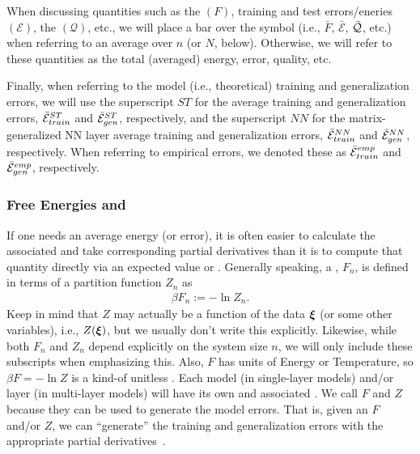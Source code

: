 {When discussing quantities such as the \FreeEnergy $(F)$, 
training and test errors/eneries $(\mathcal{E})$, 
the \LayerQuality $(\mathcal{Q})$, etc.,
we will place a bar over the symbol (i.e., $\bar{F}$, $\bar{\mathcal{E}}$, $\bar{\mathcal{Q}}$, etc.) when referring to
an average over $n$ (or $N$, below). 
Otherwise, we will refer to these quantities as the total (averaged) energy, error, quality, etc.


Finally, when referring to the model (i.e., theoretical)
training and generalization errors, we will use the superscript $ST$ for
the average \StudentTeacher training and generalization errors, $\bar{\mathcal{E}}^{ST}_{train}$ and $\bar{\mathcal{E}}^{ST}_{gen}$, respectively, and
the superscript $NN$ for the matrix-generalized NN layer average
training and generalization errors, $\bar{\mathcal{E}}^{NN}_{train}$ and $\bar{\mathcal{E}}^{NN}_{gen}$, respectively.
When referring to empirical errors, we denoted these as $\bar{\mathcal{E}}^{emp}_{train}$ and $\bar{\mathcal{E}}^{emp}_{gen}$, respectively.


\subsubsection{Free Energies and \GeneratingFunctions} 
\label{sxn:mathP_free_energies}


If one needs an average energy (or error), 
it is often easier to calculate the associated \FreeEnergy and take corresponding partial derivatives
than it is to compute that quantity directly via an expected value or \ThermalAverage.
Generally speaking, a \FreeEnergy, $F_n$, is defined in terms of a partition function $Z_{n}$ as
\begin{align}
\label{eqn:F}
\beta F_n:=-\ln Z_{n}.
\end{align}
Keep in mind that $Z$ may actually be a function of the data $\boldsymbol{\xi}$ (or some other variables),
i.e., $Z(\boldsymbol{\xi})$, but we usually don't write this explicitly.
Likewise, while  both $F_n$ and $Z_n$ depend explicitly on the system size $n$,
we will only include these subscripts when emphasizing this.
Also, $F$ has units of Energy or Temperature, so $\beta F=-\ln Z$ is a kind-of unitless \FreeEnergy.
%
Each model (in single-layer models) and/or layer (in multi-layer models) will have its own \PartitionFunction and associated \GeneratingFunctions.
We call $F$ and $Z$ \emph{\GeneratingFunctions} because they can be used to generate the model errors. 
That is, given an $F$ and/or $Z$, we can ``generate'' the training and generalization errors with the appropriate partial derivatives~\cite{LTS90, Solla2023}.

}

